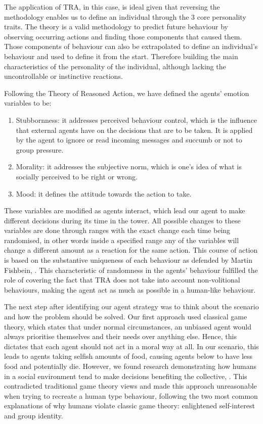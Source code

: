 The application of TRA, in this case, is ideal given that reversing the methodology enables us to define an individual through the 3 core personality traits. The theory is a valid methodology to predict future behaviour by observing occurring actions and finding those components that caused them. Those components of behaviour can also be extrapolated to define an individual's behaviour and used to define it from the start. Therefore building the main characteristics of the personality of the individual, although lacking the uncontrollable or instinctive reactions. \par
Following the Theory of Reasoned Action, we have defined the agents’ emotion variables to be: 
\begin{enumerate}
    \item Stubbornness: it addresses perceived behaviour control, which is the influence that external agents have on the decisions that are to be taken. It is applied by the agent to ignore or read incoming messages and succumb or not to group pressure. 
    \item Morality: it addresses the subjective norm, which is one's idea of what is socially perceived to be right or wrong.
    \item Mood: it defines the attitude towards the action to take.
\end{enumerate}
These variables are modified as agents interact, which lead our agent to make different decisions during its time in the tower. All possible changes to these variables are done through ranges with the exact change each time being randomised, in other words inside a specified range any of the variables will change a different amount as a reaction for the same action. This course of action is based on the substantive uniqueness of each behaviour as defended by Martin Fishbein, \cite{TRA}. This characteristic of randomness in the agents’ behaviour fulfilled the role of covering the fact that TRA does not take into account non-volitional behaviours, making the agent act as much as possible in a human-like behaviour. \par
The next step after identifying our agent strategy was to think about the scenario and how the problem should be solved. Our first approach used classical game theory, which states that under normal circumstances, an unbiased agent would always prioritise themselves and their needs over anything else. Hence, this dictates that each agent should not act in a moral way at all. In our scenario, this leads to agents taking selfish amounts of food, causing agents below to have less food and potentially die. However, we found research demonstrating how humans in a social environment tend to make decisions benefiting the collective, \cite{batson_batson_todd_brummett_shaw_aldeguer_1995}. This contradicted traditional game theory views and made this approach unreasonable when trying to recreate a human type behaviour, following the two most common explanations of why humans violate classic game theory: enlightened self-interest and group identity. 


